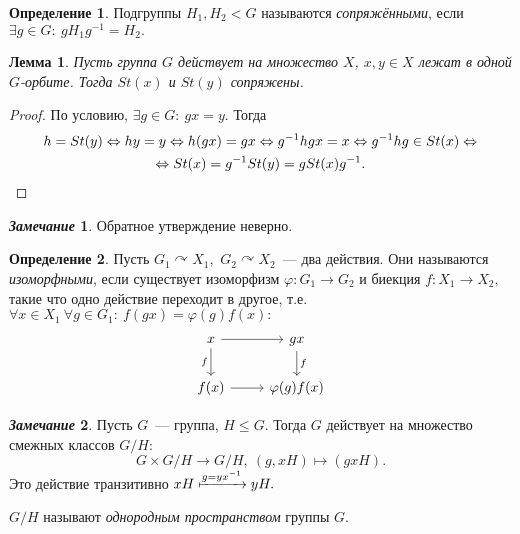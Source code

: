 \documentclass[a4paper, 14pt]{extarticle}
\newcommand{\n}{\par}
\newcommand{\suchthat}{{:}{ } \ }
\renewcommand{\phi}{\varphi}
\theoremstyle{definition}
\newtheorem*{remark}{\textit{Замечание}}
\newtheorem{definition}{Определение}
\theoremstyle{plain}
\numberwithin{theorem}{section}
\numberwithin{definition}{section}
\numberwithin{statement}{section}
\newtheorem{lemma}{Лемма}
\numberwithin{lemma}{section}
\numberwithin{consequence}{section}
\begin{document}
        \begin{definition}
            Подгруппы $H_1, H_2 < G$ называются \textit{сопряжёнными}, если $\exists g \in G\suchthat gH_1g^{-1} = H_2.$
        \end{definition}
        \begin{lemma}
        	Пусть группа $G$ действует на множество $X$, ${x,y \in X}$ лежат в одной $G$-орбите. Тогда $St(x)$ и $St(y)$ сопряжены.
        \end{lemma}
        \begin{proof}
        	По условию, ${\exists g \in G \suchthat gx = y.}$ Тогда
        	\begin{equation*}
        		\begin{gathered}
        			h = St(y) \Leftrightarrow hy = y \Leftrightarrow h(gx) = gx \Leftrightarrow g^{-1}hgx = x \Leftrightarrow g^{-1}hg \in St(x) \Leftrightarrow \\
        			 \Leftrightarrow St(x) = g^{-1}St(y) = gSt(x)g^{-1}. \qedhere
        		\end{gathered}
        	\end{equation*}
        \end{proof}
        \begin{remark}
        	Обратное утверждение неверно.
        \end{remark}
        \begin{definition}
        	Пусть ${G_1 \curvearrowright X_1,}$ ${G_2 \curvearrowright X_2}$~--- два действия. Они называются \textit{изоморфными}, если существует изоморфизм ${\phi : G_1 \rightarrow G_2}$ и биекция ${f : X_1 \rightarrow X_2,}$ такие что одно действие переходит в другое, т.е. ${\forall x \in X_1 \ \forall g \in G_1 \suchthat f(gx) = \phi(g)f(x):}$
            \[
              \begin{tikzcd}
                x \arrow{r} \arrow[swap]{d}{f} & gx \arrow{d}{f} \\
                 f(x) \arrow{r} & \phi(g)f(x)
              \end{tikzcd}
            \]
        \end{definition}
        \begin{remark}
        	Пусть $G$~--- группа, ${H \leqslant G.}$ Тогда $G$ действует на множество смежных классов ${G/H:}$
        	\begin{equation*}
        		G \times G/H \rightarrow G/H, \ (g,xH) \mapsto (gxH).
        	\end{equation*}
        	Это действие транзитивно ${xH \xmapsto{g = yx^{-1}} yH.}$ \n
        	${G/H}$ называют \textit{однородным пространством} группы $G$.
        	
        \end{remark}
\end{document}
